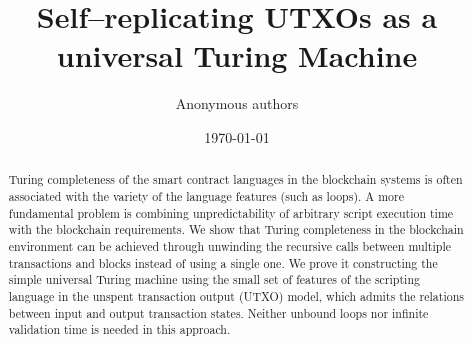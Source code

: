 \documentclass[runningheads]{llncs}
\begin{document}
    \title{Self--replicating UTXOs as a universal Turing Machine}

    \author{Anonymous authors}

    \date{\today}
    \maketitle

    \begin{abstract}
        Turing completeness of the smart contract languages in the blockchain
        systems is often associated with the variety of the language features
        (such as loops). %
		A more fundamental problem is combining unpredictability of arbitrary %
        script execution time with the blockchain requirements.
        We show that Turing completeness in the blockchain environment can
        be achieved through unwinding the recursive calls between
        multiple transactions and blocks instead of using a single one. We prove
        it constructing the simple universal Turing machine using
        the small set of features of the scripting language in the unspent
        transaction output (UTXO) model, which admits the relations between
        input and output transaction states.
        Neither unbound loops nor infinite validation time is needed in this approach.

    \end{abstract}
\end{document}
